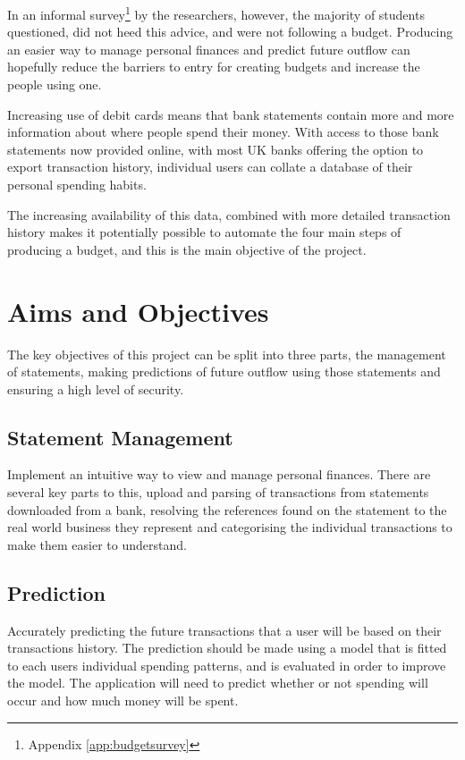 In an informal survey\footnote{Appendix \ref{app:budgetsurvey}} by the researchers, however, the majority of students questioned, did not heed this advice, and were not following a budget. Producing an easier way to manage personal finances and predict future outflow can hopefully reduce the barriers to entry for creating budgets and increase the people using one.

Increasing use of debit cards \parencite{bbc2010debit} means that bank statements contain more and more information about where people spend their money. With access to those bank statements now provided online, with most UK banks offering the option to export \gls{transaction} history, individual users can collate a database of their personal spending habits.

The increasing availability of this data, combined with more detailed \gls{transaction} history makes it potentially possible to automate the four main steps of producing a budget, and this is the main objective of the project.

\section{Aims and Objectives}
The key objectives of this project can be split into three parts, the management of statements, making predictions of future outflow using those statements and ensuring a high level of security.

\subsection{Statement Management}
Implement an intuitive way to view and manage personal finances.
%
There are several key parts to this, upload and parsing of \glspl{transaction} from statements downloaded from a bank, resolving the \glspl{reference} found on the statement to the real world business they represent and categorising the individual \glspl{transaction} to make them easier to understand.  
    
\subsection{Prediction}
Accurately predicting the future \glspl{transaction} that a user will be based on their \glspl{transaction} history.
%
The prediction should be made using a model that is fitted to each users individual spending patterns, and is evaluated in order to improve the model.
%
The application will need to predict whether or not spending will occur and how much money will be spent.


